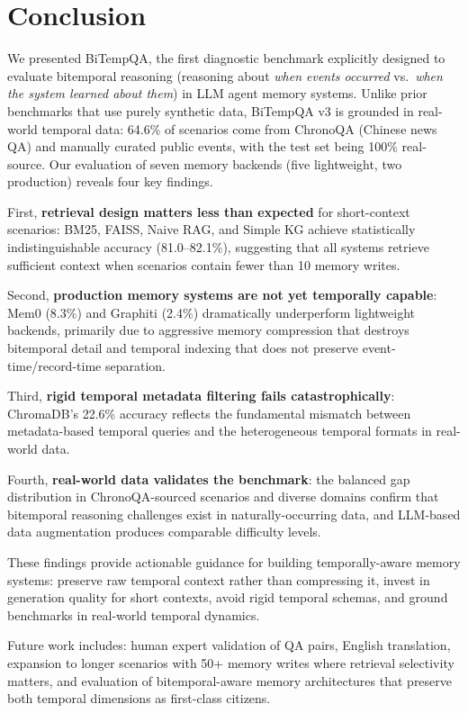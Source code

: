 \section{Conclusion}

We presented BiTempQA, the first diagnostic benchmark explicitly designed to evaluate bitemporal reasoning (reasoning about \emph{when events occurred} vs.\ \emph{when the system learned about them}) in LLM agent memory systems.
Unlike prior benchmarks that use purely synthetic data, BiTempQA v3 is grounded in real-world temporal data: 64.6\% of scenarios come from ChronoQA (Chinese news QA) and manually curated public events, with the test set being 100\% real-source.
Our evaluation of seven memory backends (five lightweight, two production) reveals four key findings.

First, \textbf{retrieval design matters less than expected} for short-context scenarios: BM25, FAISS, Naive RAG, and Simple KG achieve statistically indistinguishable accuracy (81.0--82.1\%), suggesting that all systems retrieve sufficient context when scenarios contain fewer than 10 memory writes.

Second, \textbf{production memory systems are not yet temporally capable}: Mem0 (8.3\%) and Graphiti (2.4\%) dramatically underperform lightweight backends, primarily due to aggressive memory compression that destroys bitemporal detail and temporal indexing that does not preserve event-time/record-time separation.

Third, \textbf{rigid temporal metadata filtering fails catastrophically}: ChromaDB's 22.6\% accuracy reflects the fundamental mismatch between metadata-based temporal queries and the heterogeneous temporal formats in real-world data.

Fourth, \textbf{real-world data validates the benchmark}: the balanced gap distribution in ChronoQA-sourced scenarios and diverse domains confirm that bitemporal reasoning challenges exist in naturally-occurring data, and LLM-based data augmentation produces comparable difficulty levels.

These findings provide actionable guidance for building temporally-aware memory systems: preserve raw temporal context rather than compressing it, invest in generation quality for short contexts, avoid rigid temporal schemas, and ground benchmarks in real-world temporal dynamics.

Future work includes: human expert validation of QA pairs, English translation, expansion to longer scenarios with 50+ memory writes where retrieval selectivity matters, and evaluation of bitemporal-aware memory architectures that preserve both temporal dimensions as first-class citizens.
